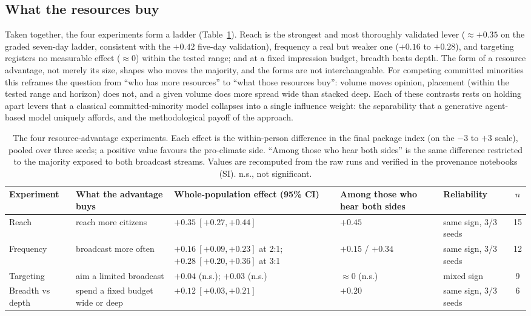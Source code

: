 \documentclass[pdflatex,sn-mathphys-num]{sn-jnl}%
\theoremstyle{thmstyleone}%
\theoremstyle{thmstyletwo}%
\theoremstyle{thmstylethree}%
\begin{document}
\subsection{What the resources buy}\label{subsec:synthesis}

Taken together, the four experiments form a ladder (Table~\ref{tab:experiments}). Reach
is the strongest and most thoroughly validated lever ($\approx +0.35$ on the graded
seven-day ladder, consistent with the $+0.42$ five-day validation), frequency a real but
weaker one ($+0.16$ to $+0.28$), and targeting registers no measurable effect ($\approx
0$) within the
tested range; and at a fixed impression budget, breadth beats depth. The form of
a resource advantage, not merely its size, shapes who moves the majority, and the
forms are not interchangeable. For competing committed minorities this reframes the
question from ``who has more resources'' to ``what those resources buy'': volume moves
opinion, placement (within the tested range and horizon) does not, and a given volume
does more spread wide than stacked deep. Each of these contrasts rests on holding apart
levers that a classical committed-minority model collapses into a single influence
weight: the separability that a generative agent-based model uniquely affords, and
the methodological payoff of the approach.

\begin{table}[t]
\centering
\small
\caption{The four resource-advantage experiments. Each effect is the within-person
difference in the final package index (on the $-3$ to $+3$ scale), pooled over three
seeds; a positive value favours the pro-climate side. ``Among those who hear both
sides'' is the same difference restricted to the majority exposed to both broadcast
streams. Values are recomputed from the raw runs and verified in the provenance
notebooks (SI). n.s., not significant.}
\label{tab:experiments}
\begin{tabular}{@{}p{2.1cm}p{3.0cm}p{4.6cm}p{2.3cm}p{2.2cm}c@{}}
\toprule
Experiment & What the advantage buys & Whole-population effect (95\% CI) & Among those who hear both sides & Reliability & $n$ \\
\midrule
Reach & reach more citizens & $+0.35\ [+0.27, +0.44]$ & $+0.45$ & same sign, 3/3 seeds & 15 \\
Frequency & broadcast more often & $+0.16\ [+0.09, +0.23]$ at 2:1; $+0.28\ [+0.20, +0.36]$ at 3:1 & $+0.15$ / $+0.34$ & same sign, 3/3 seeds & 12 \\
Targeting & aim a limited broadcast & $+0.04$ (n.s.); $+0.03$ (n.s.) & $\approx 0$ (n.s.) & mixed sign & 9 \\
Breadth vs depth & spend a fixed budget wide or deep & $+0.12\ [+0.03, +0.21]$ & $+0.20$ & same sign, 3/3 seeds & 6 \\
\bottomrule
\end{tabular}
\end{table}
\end{document}
